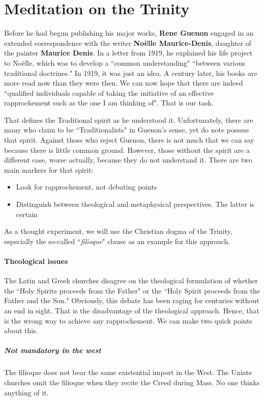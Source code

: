 \section{Meditation on the Trinity}

Before he had begun publishing his major works, \textbf{Rene Guenon} engaged in an extended correspondence with the writer \textbf{Noëlle Maurice-Denis}, daughter of the painter \textbf{Maurice Denis}. In a letter from 1919, he explained his life project to Noëlle, which was to develop a ``common understanding" ``between various traditional doctrines." In 1919, it was just an idea. A century later, his books are more read now than they were then. We can now hope that there are indeed ``qualified individuals capable of taking the initiative of an effective rapprochement such as the one I am thinking of". That is our task.

That defines the Traditional spirit as he understood it. Unfortunately, there are many who claim to be ``Traditionalists" in Guenon's sense, yet do note possess that spirit. Against those who reject Guenon, there is not much that we can say because there is little common ground. However, those without the spirit are a different case, worse actually, because they do not understand it. There are two main markers for that spirit:

\begin{itemize}
\item Look for rapprochement, not debating points 
\item Distinguish between theological and metaphysical perspectives. The latter is certain 
\end{itemize}
As a thought experiment, we will use the Christian dogma of the Trinity, especially the so-called ``\emph{filioque}" clause as an example for this approach.

\paragraph{Theological issues}
The Latin and Greek churches disagree on the theological formulation of whether the ``Holy Spirits proceeds from the Father" or the ``Holy Spirit proceeds from the Father and the Son." Obviously, this debate has been raging for centuries without an end in sight. That is the disadvantage of the theological approach. Hence, that is the wrong way to achieve any rapprochement. We can make two quick points about this.

\subparagraph{Not mandatory in the west}
The filioque does not bear the same existential import in the West. The Uniate churches omit the filioque when they recite the Creed during Mass. No one thinks anything of it.


